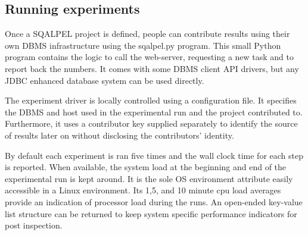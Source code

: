 \documentclass{cidr-2019}
\begin{document}
\subsection{Running experiments}

Once a {\sc SQALPEL}  project is defined, people can contribute results using their
own DBMS infrastructure using the {\sc  sqalpel.py} program.
This small Python program contains the logic to call the web-server,
requesting a new task and to report back the numbers.
It comes with some DBMS client API drivers, but any
JDBC enhanced database system can be used directly.

The experiment driver is locally controlled using a configuration file.
It specifies the DBMS and host used in the experimental run
and the project contributed to.
Furthermore, it uses a contributor key supplied separately to identify
the source of results later on without disclosing the contributors' identity.

By default each experiment is ran five times and the wall clock time 
for each step is reported. 
When available, the system load at the 
beginning and end of the experimental run is kept around.
It is the sole OS environment attribute easily accessible in a Linux environment.
Its 1,5, and 10 minute {\sc cpu} load averages provide an indication of processor load during the runs.
An open-ended key-value list structure can be returned to keep system specific
performance indicators for post inspection.


\end{document}
